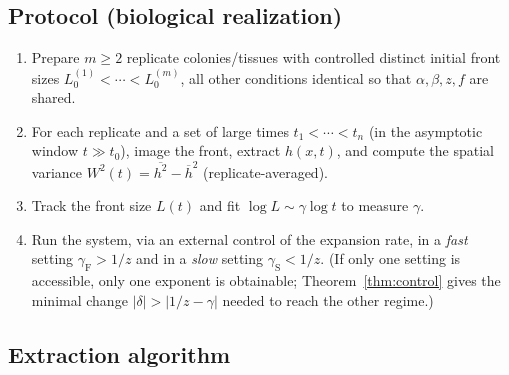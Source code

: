 \documentclass{amsart}
\theoremstyle{definition}
\begin{document}
\subsection*{Protocol (biological realization)}
\begin{enumerate}
\item Prepare $m\ge2$ replicate colonies/tissues with controlled distinct initial
  front sizes $L_0^{(1)}<\cdots<L_0^{(m)}$, all other conditions identical so that
  $\alpha,\beta,z,f$ are shared.
\item For each replicate and a set of large times $t_1<\cdots<t_n$ (in the
  asymptotic window $t\gg t_0$), image the front, extract $h(x,t)$, and compute the
  spatial variance $W^2(t)=\overline{h^2}-\overline h^2$ (replicate-averaged).
\item Track the front size $L(t)$ and fit $\log L\sim\gamma\log t$ to measure
  $\gamma$.
\item Run the system, via an external control of the expansion rate, in a
  \emph{fast} setting $\gamma_{\mathrm F}>1/z$ and in a \emph{slow} setting
  $\gamma_{\mathrm S}<1/z$. (If only one setting is accessible, only one exponent
  is obtainable; Theorem~\ref{thm:control} gives the minimal change
  $|\delta|>|1/z-\gamma|$ needed to reach the other regime.)
\end{enumerate}

\subsection*{Extraction algorithm}
\end{document}
